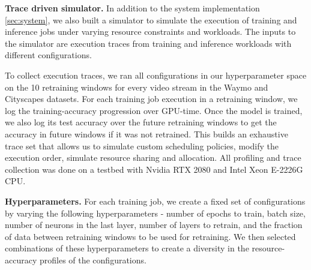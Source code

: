 




\noindent\textbf{Trace driven simulator.}
In addition to the system implementation \cref{sec:system}, we also built a simulator to simulate the execution of training and inference jobs under varying resource constraints and workloads. The inputs to the simulator are execution traces from training and inference workloads with different configurations. 

To collect execution traces, we ran all configurations in our hyperparameter space on the 10 retraining windows for every video stream in the Waymo and Cityscapes datasets. For each training job execution in a retraining window, we log the training-accuracy progression over GPU-time. Once the model is trained, we also log its test accuracy over the future retraining windows to get the accuracy in future windows if it was not retrained. This builds an exhaustive trace set that allows us to simulate custom scheduling policies, modify the execution order, simulate resource sharing and allocation. All profiling and trace collection was done on a testbed with Nvidia RTX 2080 and Intel Xeon E-2226G CPU.


\textbf{Hyperparameters.}
For each training job, we create a fixed set of configurations by varying the following hyperparameters - number of epochs to train, batch size, number of neurons in the last layer, number of layers to retrain, and the fraction of data between retraining windows to be used for retraining. We then selected combinations of these hyperparameters to create a diversity in the resource-accuracy profiles of the configurations. 

